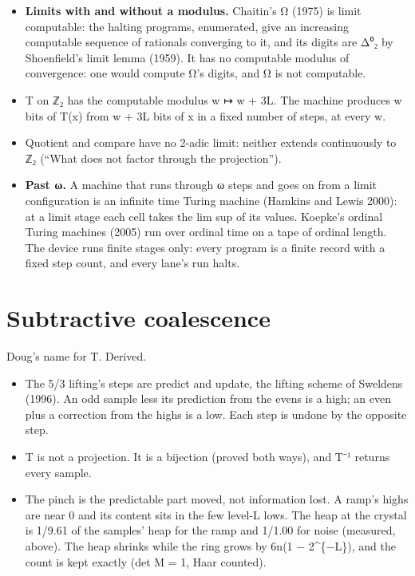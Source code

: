 \begin{itemize}
\item \textbf{Limits with and without a modulus.} Chaitin's Ω (1975) is limit computable: the halting programs, enumerated, give an increasing computable sequence of rationals converging to it, and its digits are Δ⁰₂ by Shoenfield's limit lemma (1959). It has no computable modulus of convergence: one would compute Ω's digits, and Ω is not computable.
\item T on ℤ₂ has the computable modulus w ↦ w + 3L. The machine produces w bits of T(x) from w + 3L bits of x in a fixed number of steps, at every w.
\item Quotient and compare have no 2-adic limit: neither extends continuously to ℤ₂ (“What does not factor through the projection”).
\item \textbf{Past ω.} A machine that runs through ω steps and goes on from a limit configuration is an infinite time Turing machine (Hamkins and Lewis 2000): at a limit stage each cell takes the lim sup of its values. Koepke's ordinal Turing machines (2005) run over ordinal time on a tape of ordinal length. The device runs finite stages only: every program is a finite record with a fixed step count, and every lane's run halts.
\end{itemize}

\section{\texorpdfstring{Subtractive coalescence}{Subtractive coalescence}}

Doug's name for T. Derived.

\begin{itemize}
\item The 5/3 lifting's steps are predict and update, the lifting scheme of Sweldens (1996). An odd sample less its prediction from the evens is a high; an even plus a correction from the highs is a low. Each step is undone by the opposite step.
\item T is not a projection. It is a bijection (proved both ways), and T⁻¹ returns every sample.
\item The pinch is the predictable part moved, not information lost. A ramp's highs are near 0 and its content sits in the few level-L lows. The heap at the crystal is 1/9.61 of the samples' heap for the ramp and 1/1.00 for noise (measured, above). The heap shrinks while the ring grows by 6n(1 − 2\textasciicircum{}\{−L\}), and the count is kept exactly (det M = 1, Haar counted).
\end{itemize}

